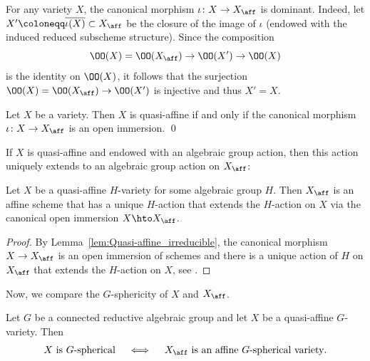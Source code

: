 \begin{remark}
\label{rem.canonical_morphi_dominant}
For any variety $X$, the
canonical morphism $\iota \colon X \to X_{\aff}$ is dominant. Indeed, let
$X' \coloneqq \overline{\iota(X)} \subset X_{\aff}$ be the closure of the image of $\iota$
(endowed with the induced reduced subscheme structure).
Since the composition
\[
\OO(X) = \OO(X_{\aff}) \to \OO(X') \to \OO(X)
\]
is the identity on $\OO(X)$, it follows that the surjection $\OO(X)= \OO(X_{\aff}) \to \OO(X')$
is injective and thus $X' = X$.
\end{remark}

\begin{lemma}
\label{lem:Quasi-affine_irreducible}
Let $X$ be a variety. Then $X$ is quasi-affine if and only if the canonical morphism
$\iota \colon X \to X_{\aff}$ is an open immersion. \qed
\end{lemma}

If $X$ is quasi-affine and endowed with an algebraic group action, then this
action uniquely extends to an algebraic group action on $X_{\aff}$:

\begin{lemma}
\label{lem:Quasi-affine_group_action}
Let $X$ be a quasi-affine $H$-variety for some algebraic group $H$.
Then $X_{\aff}$ is an affine scheme that has a unique
$H$-action that extends the $H$-action on $X$ via the canonical open immersion
$X \hto X_{\aff}$.
\end{lemma}

\begin{proof}
By Lemma~\ref{lem:Quasi-affine_irreducible},
the canonical morphism $X \to X_{\aff}$
is an open immersion of schemes
and there is a unique action of $H$ on $X_{\aff}$ that extends the $H$-action on $X$, see
\eg \cite[Lem.\,5]{KrReSa2018Is-the-affine-spac}.
\end{proof}

Now, we compare the $G$-sphericity of $X$ and $X_{\aff}$.

\begin{lemma}
\label{lem:Spherical_quasi-affine}
Let $G$ be a connected reductive algebraic group and
let $X$ be a quasi-affine $G$-variety. Then
\[
\textrm{$X$ is $G$-spherical} \quad \iff \quad
\textrm{$X_{\aff}$ is an affine $G$-spherical variety}.
\]
\end{lemma}

